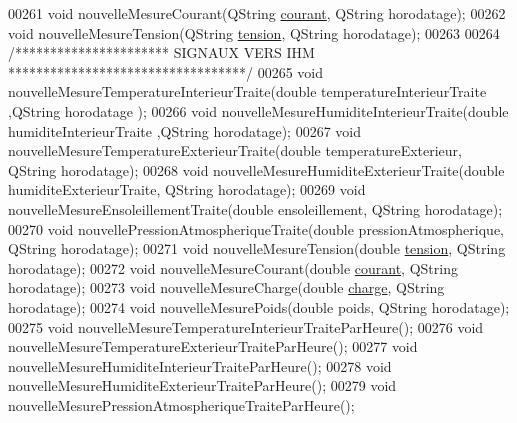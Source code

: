 \begin{DoxyCode}
00261         \textcolor{keywordtype}{void} nouvelleMesureCourant(QString \hyperlink{struct_donnees_batterie_a7a996ea5eacd6839a8a34dbbe48eb59a}{courant}, QString horodatage);
00262         \textcolor{keywordtype}{void} nouvelleMesureTension(QString \hyperlink{struct_donnees_batterie_a1394510ba159a846820452e9e333f38b}{tension}, QString horodatage);
00263 
00264         \textcolor{comment}{/********************** SIGNAUX VERS IHM **********************************/}
00265         \textcolor{keywordtype}{void} nouvelleMesureTemperatureInterieurTraite(\textcolor{keywordtype}{double} temperatureInterieurTraite ,QString horodatage
      ); 
00266         \textcolor{keywordtype}{void} nouvelleMesureHumiditeInterieurTraite(\textcolor{keywordtype}{double} humiditeInterieurTraite ,QString horodatage); 
00267         \textcolor{keywordtype}{void} nouvelleMesureTemperatureExterieurTraite(\textcolor{keywordtype}{double} temperatureExterieur, QString horodatage);
00268         \textcolor{keywordtype}{void} nouvelleMesureHumiditeExterieurTraite(\textcolor{keywordtype}{double} humiditeExterieurTraite, QString horodatage);
00269         \textcolor{keywordtype}{void} nouvelleMesureEnsoleillementTraite(\textcolor{keywordtype}{double} ensoleillement, QString horodatage);
00270         \textcolor{keywordtype}{void} nouvellePressionAtmospheriqueTraite(\textcolor{keywordtype}{double} pressionAtmospherique, QString horodatage);
00271         \textcolor{keywordtype}{void} nouvelleMesureTension(\textcolor{keywordtype}{double} \hyperlink{struct_donnees_batterie_a1394510ba159a846820452e9e333f38b}{tension}, QString horodatage);
00272         \textcolor{keywordtype}{void} nouvelleMesureCourant(\textcolor{keywordtype}{double} \hyperlink{struct_donnees_batterie_a7a996ea5eacd6839a8a34dbbe48eb59a}{courant}, QString horodatage);
00273         \textcolor{keywordtype}{void} nouvelleMesureCharge(\textcolor{keywordtype}{double} \hyperlink{struct_donnees_batterie_a4d3cf76cf1722835a6449bc4a29e761b}{charge}, QString horodatage);
00274         \textcolor{keywordtype}{void} nouvelleMesurePoids(\textcolor{keywordtype}{double} poids,  QString horodatage);
00275         \textcolor{keywordtype}{void} nouvelleMesureTemperatureInterieurTraiteParHeure();
00276         \textcolor{keywordtype}{void} nouvelleMesureTemperatureExterieurTraiteParHeure();
00277         \textcolor{keywordtype}{void} nouvelleMesureHumiditeInterieurTraiteParHeure();
00278         \textcolor{keywordtype}{void} nouvelleMesureHumiditeExterieurTraiteParHeure();
00279         \textcolor{keywordtype}{void} nouvelleMesurePressionAtmospheriqueTraiteParHeure();

\end{DoxyCode}
